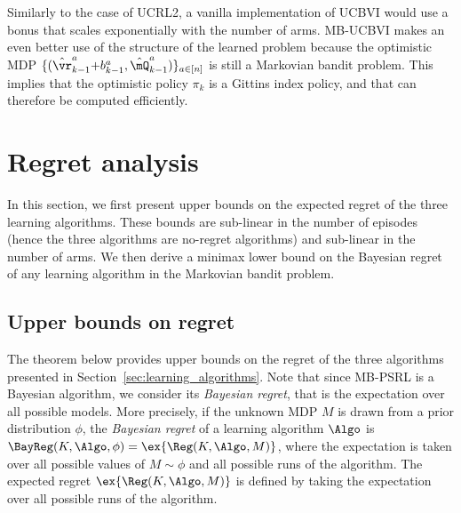 Similarly to the case of UCRL2, a vanilla implementation of UCBVI would use a bonus that scales exponentially with the number of arms. MB-UCBVI makes an even  better use of the structure of the learned problem because the optimistic MDP $\{(\hat{\vr}_{k-1}^a {+}b_{k-1}^a, \hat{\mQ}_{k-1}^a)\}_{a\in[n]}$ is still a Markovian bandit problem. This implies that the optimistic policy $\pi_k$ is a Gittins index policy, and that can therefore be computed efficiently.

\section{Regret analysis}
\label{sec:analysis}

In this section, we first present upper bounds on the expected regret of the three learning algorithms.  These bounds are sub-linear in the number of episodes (hence the three algorithms are no-regret algorithms) and sub-linear in the number of arms. We then derive a minimax lower bound on the Bayesian regret of any learning algorithm in the Markovian bandit problem. 

\subsection{Upper bounds on regret}
\label{ssec:upper_bound_psrl}

The theorem below provides upper bounds on the regret of the three algorithms presented in Section~\ref{sec:learning_algorithms}. Note that since MB-PSRL is a Bayesian algorithm, we consider its \emph{Bayesian regret}, that is the expectation over all possible models. More precisely, if the unknown MDP $M$ is drawn from a prior distribution $\phi$, the \textit{Bayesian regret} of a learning algorithm $\Algo$ is $\BayReg(K,\Algo,\phi) = \ex{\Reg(K,\Algo,M)}$, where the expectation is taken over all possible values of $M \sim \phi$ and all possible runs of the algorithm. The expected regret $\ex{\Reg(K,\Algo,M)}$ is defined by taking the expectation over all possible runs of the algorithm.

